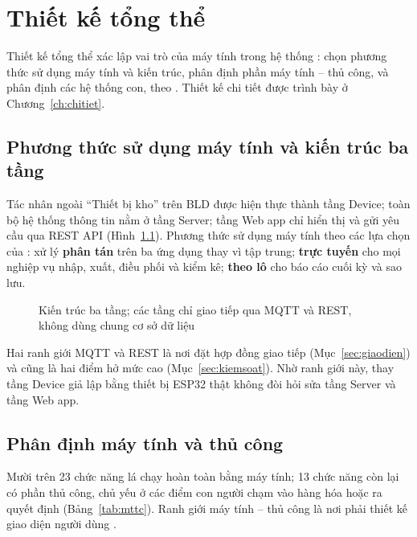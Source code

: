 \chapter{Thiết kế tổng thể}
\label{ch:tongthe}

Thiết kế tổng thể xác lập vai trò của máy tính trong hệ thống \cite[Ch.~1]{tung_qlhttt}: chọn phương thức sử dụng máy tính và kiến trúc, phân định phần máy tính -- thủ công, và phân định các hệ thống con, theo \cite[Ch.~7]{tung_qlhttt}. Thiết kế chi tiết được trình bày ở Chương~\ref{ch:chitiet}.

\section{Phương thức sử dụng máy tính và kiến trúc ba tầng}
\label{sec:kientruc}

Tác nhân ngoài “Thiết bị kho” trên BLD được hiện thực thành tầng Device; toàn bộ hệ thống thông tin nằm ở tầng Server; tầng Web app chỉ hiển thị và gửi yêu cầu qua REST API (Hình~\ref{fig:kientruc}). Phương thức sử dụng máy tính theo các lựa chọn của \cite[Ch.~7]{tung_qlhttt}: xử lý \textbf{phân tán} trên ba ứng dụng thay vì tập trung; \textbf{trực tuyến} cho mọi nghiệp vụ nhập, xuất, điều phối và kiểm kê; \textbf{theo lô} cho báo cáo cuối kỳ và sao lưu.

\begin{figure}[H]
\centering
{}
\caption{Kiến trúc ba tầng; các tầng chỉ giao tiếp qua MQTT và REST, không dùng chung cơ sở dữ liệu}
\label{fig:kientruc}
\end{figure}

Hai ranh giới MQTT và REST là nơi đặt hợp đồng giao tiếp (Mục~\ref{sec:giaodien}) và cũng là hai điểm hở mức cao (Mục~\ref{sec:kiemsoat}). Nhờ ranh giới này, thay tầng Device giả lập bằng thiết bị ESP32 thật không đòi hỏi sửa tầng Server và tầng Web app.

\section{Phân định máy tính và thủ công}
\label{sec:mttc}

Mười trên 23 chức năng lá chạy hoàn toàn bằng máy tính; 13 chức năng còn lại có phần thủ công, chủ yếu ở các điểm con người chạm vào hàng hóa hoặc ra quyết định (Bảng~\ref{tab:mttc}). Ranh giới máy tính -- thủ công là nơi phải thiết kế giao diện người dùng \cite[Ch.~7]{tung_qlhttt}.

